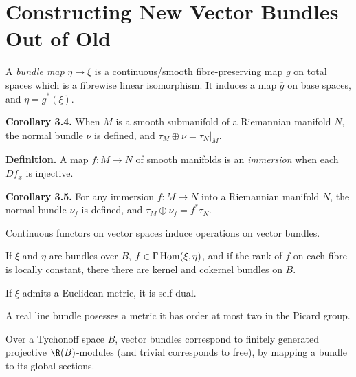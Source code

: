 \documentclass[11pt]{article}
\begin{document}
\section{Constructing New Vector Bundles Out of Old}
\begin{itemise}
\item A \emph{bundle map} $\eta\to\xi$ is a continuous/smooth fibre-preserving map $g$ on total spaces which is a fibrewise linear isomorphism. It induces a map $\overline g$ on base spaces, and $\eta=\overline g^*(\xi)$.
\item \textbf{Corollary 3.4.} When $M$ is a smooth submanifold of a Riemannian manifold $N$, the normal bundle $\nu$ is defined, and $\tau_M\oplus\nu=\tau_N|_M$.
\item \textbf{Definition.} A map $f:M\to N$ of smooth manifolds is an \emph{immersion} when each $Df_x$ is injective.
\item \textbf{Corollary 3.5.} For any immersion $f:M\to N$ into a Riemannian manifold $N$, the normal bundle $\nu_f$ is defined, and $\tau_M\oplus\nu_f=f^*\tau_N$.
\item Continuous functors on vector spaces induce operations on vector bundles.
\item If $\xi$ and $\eta$ are bundles over $B$, $f\in\Gamma\operatorname{Hom}(\xi,\eta)$, and if the rank of $f$ on each fibre is locally constant, there there are kernel and cokernel bundles on $B$.
\item If $\xi$ admits a Euclidean metric, it is self dual.
\item A real line bundle posesses a metric \Iff it has order at most two in the Picard group.
\item Over a Tychonoff space $B$, vector bundles correspond to finitely generated projective $\R(B)$-modules (and trivial corresponds to free), by mapping a bundle to its global sections.
\end{itemise}
\end{document}
